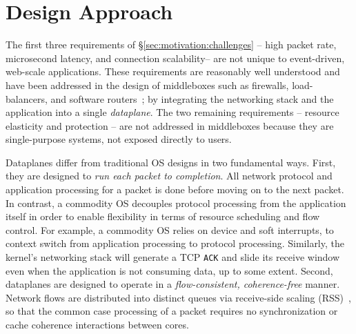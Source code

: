 \section{\ix Design Approach}
\label{sec:design}


The first three requirements of \S\ref{sec:motivation:challenges} --
high packet rate, microsecond latency, and connection scalability--
are not unique to event-driven, web-scale applications.  These
requirements are reasonably well understood and have been addressed in
the design of middleboxes such as firewalls,
load-balancers, and software
routers~\cite{DBLP:journals/tocs/KohlerMCJK00,DBLP:conf/sosp/DobrescuEACFIKMR09};
by integrating the networking stack and the application into a single
\emph{dataplane}. The two remaining requirements -- resource elasticity
and protection -- are not addressed in middleboxes because they
are single-purpose systems, not exposed directly to users.


Dataplanes differ from traditional OS designs in two fundamental
ways. First, they are designed to \emph{run each packet to
  completion}. All network protocol and application processing for a
packet is done before moving on to the next packet.  In contrast, a
commodity OS decouples protocol processing from the application itself
in order to enable flexibility in terms of resource scheduling and
flow control. For example, a commodity OS relies on device and soft
interrupts, to context switch from application processing to protocol
processing. Similarly, the kernel's networking stack will generate a
TCP \texttt{ACK} and slide its receive window even when the
application is not consuming data, up to some extent. Second,
dataplanes are designed to operate in a \emph{flow-consistent,
  coherence-free} manner.  Network flows are distributed into distinct
queues via receive-side scaling
(RSS)~\cite{DBLP:journals/computer/RegnierMIIMHNCF04}, so that the
common case processing of a packet requires no synchronization or
cache coherence interactions between cores.

